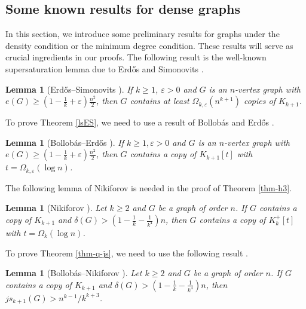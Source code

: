 \documentclass[11pt,a4paper]{article}
\theoremstyle{plain}
\newtheorem{lem}[theorem]{Lemma}
\theoremstyle{definition}
\begin{document}
{
\subsection{Some known results for dense graphs}

In this section, we introduce some preliminary results for graphs under the density condition or the minimum degree condition. These results will serve as crucial ingredients in our proofs. 
The following result is the well-known supersaturation lemma due to Erd\H{o}s and Simonovits \cite{ES1983-super}. 

\begin{lem}[Erd\H{o}s--Simonovits \cite{ES1983-super}]  \label{lem-super-cliques}
If $k\ge 1$, $\varepsilon >0$ and 
 $G$ is an $n$-vertex graph with 
$e(G) \ge ( 1-\frac{1}{k}+\varepsilon ) \frac{n^2}{2}$, 
then $G$ contains at least $\Omega_{k,\varepsilon} (n^{k+1})$ copies of $K_{k+1}$. 
\end{lem}

To prove Theorem \ref{lsES}, 
we need to use a result of Bollob\'as and Erd\H{o}s  \cite{BE1973}.  

\begin{lem}[Bollob\'{a}s--Erd\H{o}s \cite{BE1973}] \label{lem-BE1973} 
If $k\ge 1, \varepsilon >0$ and $G$ is an $n$-vertex graph with 
$ e(G)\ge (1-\frac{1}{k}+\varepsilon ) \frac{n^2}{2}$, then $G$  
contains a copy of $K_{k+1}[t]$ with  $t=\Omega_{k,\varepsilon}(\log n)$. 
\end{lem}


The following lemma of Nikiforov \cite{N2010} is needed in the proof of Theorem \ref{thm-h3}. 

\begin{lem}[Nikiforov \cite{N2010}]\label{h2}
Let $k\geq2$ and $G$ be a graph of order $n$. If $G$ contains a copy of $K_{k+1}$ and
$\delta(G)>(1- \frac{1}{k}- \frac{1}{k^{4}})n$, then $G$ contains a copy of 
$K_{k}^{+}[t]$ with $t=\Omega_k(\log n)$.
\end{lem}


To prove Theorem \ref{thm-q-js}, we need to use the following result \cite[Lemma 6]{BN2008}.  

\begin{lem}[Bollob\'{a}s--Nikiforov \cite{BN2008}]  \label{lem-lem6}
 Let $k\ge 2$ and $G$ be a graph of order $n$. 
If $G$ contains a copy of $K_{k+1}$ and $\delta (G)>(1-\frac{1}{k}-\frac{1}{k^4})n$, 
then $js_{k+1}(G) > {n^{k-1}}/{k^{k+3}}$. 
\end{lem} 
 

}
\end{document}
